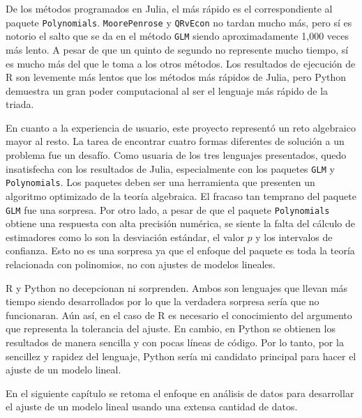 De los métodos programados en \textsf{Julia}, el más rápido es el correspondiente al paquete \texttt{Polynomials}. \texttt{MoorePenrose} y \texttt{QRvEcon} no tardan mucho más, pero sí es notorio el salto que se da en el método \texttt{GLM} siendo aproximadamente 1,000 veces más lento. A pesar de que un quinto de segundo no represente mucho tiempo, sí es mucho más del que le toma a los otros métodos. Los resultados de ejecución de \textsf{R} son levemente más lentos que los métodos más rápidos de \textsf{Julia}, pero \textsf{Python} demuestra un gran poder computacional al ser el lenguaje más rápido de la triada. 

En cuanto a la experiencia de usuario, este proyecto representó un reto algebraico mayor al resto. La tarea de encontrar cuatro formas diferentes de solución a un problema fue un desafío. Como usuaria de los tres lenguajes presentados, quedo insatisfecha con los resultados de \textsf{Julia}, especialmente con los paquetes \texttt{GLM} y \texttt{Polynomials}. Los paquetes deben ser una herramienta que presenten un algoritmo optimizado de la teoría algebraica. El fracaso tan temprano del paquete \texttt{GLM} fue una sorpresa. Por otro lado, a pesar de que el paquete \texttt{Polynomials} obtiene una respuesta con alta precisión numérica, se siente la falta del cálculo de estimadores como lo son la desviación estándar, el valor $p$ y los intervalos de confianza. Esto no es una sorpresa ya que el enfoque del paquete es toda la teoría relacionada con polinomios, no con ajustes de modelos lineales. 

\textsf{R} y \textsf{Python} no decepcionan ni sorprenden. Ambos son lenguajes que llevan más tiempo siendo desarrollados por lo que la verdadera sorpresa sería que no funcionaran. Aún así, en el caso de \textsf{R} es necesario el conocimiento del argumento que representa la tolerancia del ajuste. En cambio, en \textsf{Python} se obtienen los resultados de manera sencilla y con pocas líneas de código. Por lo tanto, por la sencillez y rapidez del lenguaje, \textsf{Python} sería mi candidato principal para hacer el ajuste de un modelo lineal. 

En el siguiente capítulo se retoma el enfoque en análisis de datos para desarrollar el ajuste de un modelo lineal usando una extensa cantidad de datos. 

